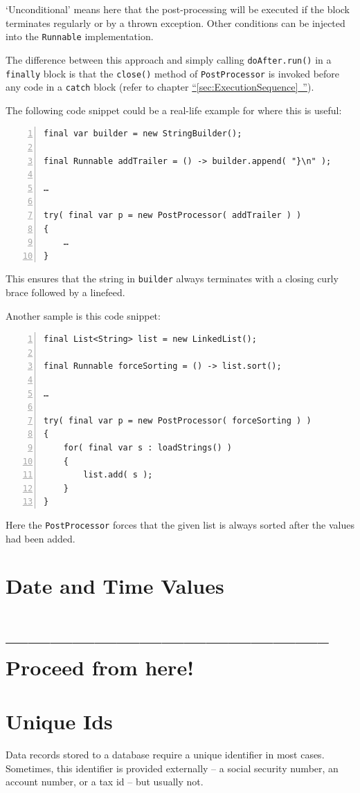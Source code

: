 \documentclass[11pt,a4paper, titlepage, parskip=half, headsepline, footsepline, cleardoublepage=current, headheight=1cm]{scrbook}
\newcommand*{\tqfullref}[1]{\hyperref[{#1}]{“\ref*{#1}~\nameref*{#1}”}}
\begin{document}
‘Unconditional’ means here that the post-processing will be executed if the block terminates regularly or by a thrown exception. Other conditions can be injected into the \lstinline|Runnable|\autocite{ORACLE_DOC_RUNNABLE_INTERFACE} implementation.

The difference between this approach and simply calling \lstinline|doAfter.run()| in a \lstinline|finally| block is that the \lstinline|close()| method of \lstinline|PostProcessor| is invoked before any code in a \lstinline|catch| block (refer to chapter \tqfullref{sec:ExecutionSequence}).

The following code snippet could be a real-life example for where this is useful:
\begin{lstlisting}[numbers=left]
final var builder = new StringBuilder();

final Runnable addTrailer = () -> builder.append( "}\n" );

…

try( final var p = new PostProcessor( addTrailer ) )
{
    …
}
\end{lstlisting}
This ensures that the string in \lstinline|builder| always terminates with a closing curly brace followed by a linefeed.

Another sample is this code snippet:
\begin{lstlisting}[numbers=left]
final List<String> list = new LinkedList();

final Runnable forceSorting = () -> list.sort();

…

try( final var p = new PostProcessor( forceSorting ) )
{
    for( final var s : loadStrings() )
    {
        list.add( s );
    }
}
\end{lstlisting}
Here the \lstinline|PostProcessor| forces that the given list is always sorted after the values had been added.

\section{Date and Time Values}\label{sec:DateAndTimeValues}
\section{-------------------------------------------- Proceed from here!}
\lipsum[1]

\section{Unique Ids}\label{sec:UniqueIds}
Data records stored to a database require a unique identifier in most cases. Sometimes, this identifier is provided externally – a social security number, an account number, or a tax id – but usually not. 
\end{document}
